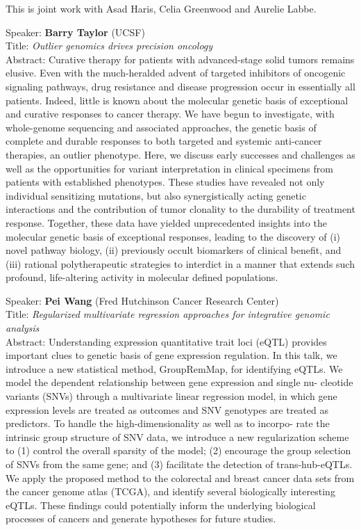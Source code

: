 \documentclass[11pt]{article}
\begin{document}
\noindent This is joint work with Asad Haris, Celia Greenwood and Aurelie Labbe.

\bigskip
\noindent
Speaker: {\bf Barry Taylor} (UCSF)\\
Title: {\it Outlier genomics drives precision oncology }\\
Abstract: Curative therapy for patients with advanced-stage solid tumors remains
elusive. Even with the much-heralded advent of targeted inhibitors of
oncogenic signaling pathways, drug resistance and disease progression
occur in essentially all patients. Indeed, little is known about the
molecular genetic basis of exceptional and curative responses to
cancer therapy. We have begun to investigate, with whole-genome
sequencing and associated approaches, the genetic basis of complete
and durable responses to both targeted and systemic anti-cancer
therapies, an outlier phenotype. Here, we discuss early successes and
challenges as well as the opportunities for variant interpretation in
clinical specimens from patients with established phenotypes. These
studies have revealed not only individual sensitizing mutations, but
also synergistically acting genetic interactions and the contribution
of tumor clonality to the durability of treatment response. Together,
these data have yielded unprecedented insights into the molecular
genetic basis of exceptional responses, leading to the discovery of
(i) novel pathway biology, (ii) previously occult biomarkers of
clinical benefit, and (iii) rational polytherapeutic strategies to
interdict in a manner that extends such profound, life-altering
activity in molecular defined populations.
 
\bigskip
\noindent
Speaker: {\bf Pei Wang} (Fred Hutchinson Cancer Research Center)\\
Title: {\it Regularized multivariate regression approaches for integrative genomic analysis}\\
Abstract: Understanding expression quantitative trait loci (eQTL)
provides important clues to genetic basis of gene expression
regulation. In this talk, we introduce a new statistical method,
GroupRemMap, for identifying eQTLs.  We model the dependent
relationship between gene expression and single nu- cleotide variants
(SNVs) through a multivariate linear regression model, in which gene
expression levels are treated as outcomes and SNV genotypes are
treated as predictors. To handle the high-dimensionality as well as to
incorpo- rate the intrinsic group structure of SNV data, we introduce
a new regularization scheme to (1) control the overall sparsity of the
model; (2) encourage the group selection of SNVs from the same gene;
and (3) facilitate the detection of trans-hub-eQTLs. We apply the
proposed method to the colorectal and breast cancer data sets from the
cancer genome atlas (TCGA), and identify several biologically
interesting eQTLs. These findings could potentially inform the
underlying biological processes of cancers and generate hypotheses for
future studies.
\end{document}
